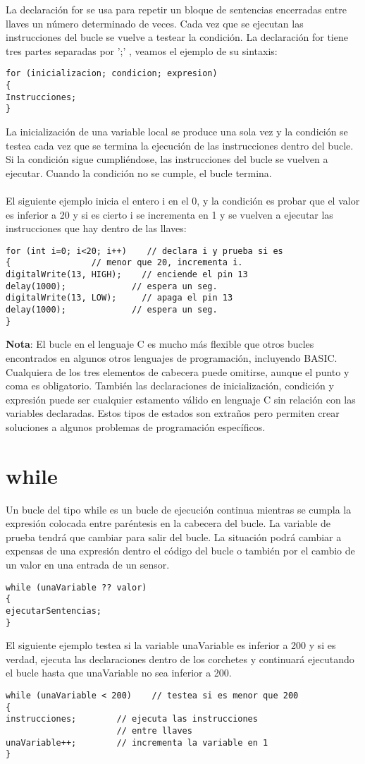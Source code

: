 La declaración for se usa para repetir un bloque de sentencias encerradas entre llaves un número determinado de veces. Cada vez que se ejecutan las instrucciones del bucle se vuelve a testear la condición. La declaración for tiene tres partes separadas por ';' , veamos el ejemplo de su sintaxis:
\begin{lstlisting}
for (inicializacion; condicion; expresion)
{
Instrucciones;
}
\end{lstlisting}
La inicialización de una variable local se produce una sola vez y la condición se testea cada vez que se termina la ejecución de las instrucciones dentro del bucle. Si la condición sigue cumpliéndose, las instrucciones del bucle se vuelven a ejecutar. Cuando la condición no se cumple, el bucle termina.\\\\
El siguiente ejemplo inicia el entero i en el 0, y la condición es probar que el valor es inferior a 20 y si es cierto i se incrementa en 1 y se vuelven a ejecutar las instrucciones que hay dentro de las llaves:
\begin{lstlisting}
for (int i=0; i<20; i++)    // declara i y prueba si es
{                // menor que 20, incrementa i.
digitalWrite(13, HIGH);    // enciende el pin 13
delay(1000);             // espera un seg.
digitalWrite(13, LOW);     // apaga el pin 13
delay(1000);             // espera un seg.
}
\end{lstlisting}
\textbf{Nota}: El bucle en el lenguaje C es mucho más flexible que otros bucles encontrados en algunos otros lenguajes de programación, incluyendo BASIC. Cualquiera de los tres elementos de cabecera puede omitirse, aunque el punto y coma es obligatorio. También las declaraciones de inicialización, condición y expresión puede ser cualquier estamento válido en lenguaje C sin relación con las variables declaradas. Estos tipos de estados son extraños pero permiten crear soluciones a algunos problemas de programación específicos.
\section{while}

Un bucle del tipo while es un bucle de ejecución continua mientras se cumpla la expresión colocada entre paréntesis en la cabecera del bucle. La variable de prueba tendrá que cambiar para salir del bucle. La situación podrá cambiar a expensas de una expresión dentro el código del bucle o también por el cambio de un valor en una entrada de un sensor.
\begin{lstlisting}
while (unaVariable ?? valor)
{
ejecutarSentencias;
}
\end{lstlisting}
El siguiente ejemplo testea si la variable unaVariable es inferior a 200 y si es verdad, ejecuta las declaraciones dentro de los corchetes y continuará ejecutando el bucle hasta que unaVariable no sea inferior a 200.
\begin{lstlisting}
while (unaVariable < 200)    // testea si es menor que 200
{
instrucciones;        // ejecuta las instrucciones
                      // entre llaves
unaVariable++;        // incrementa la variable en 1
}
\end{lstlisting}
